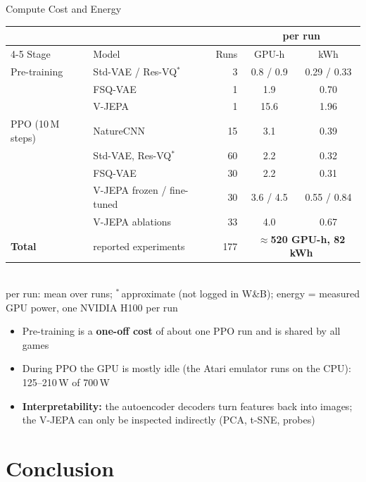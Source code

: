 \documentclass[aspectratio=43,10pt]{beamer}
\begin{document}
\begin{frame}{Compute Cost and Energy}
  \centering
  {\footnotesize\setlength{\tabcolsep}{4pt}
  \begin{tabular}{@{}llrcc@{}}
    \toprule
    & & & \multicolumn{2}{c}{per run} \\
    \cmidrule(lr){4-5}
    Stage & Model & Runs & GPU-h & kWh \\
    \midrule
    Pre-training & Std-VAE / Res-VQ$^{*}$ & 3 & 0.8 / 0.9 & 0.29 / 0.33 \\
     & FSQ-VAE & 1 & 1.9 & 0.70 \\
     & V-JEPA & 1 & 15.6 & 1.96 \\
    \midrule
    PPO (10\,M steps) & NatureCNN & 15 & 3.1 & 0.39 \\
     & Std-VAE, Res-VQ$^{*}$ & 60 & 2.2 & 0.32 \\
     & FSQ-VAE & 30 & 2.2 & 0.31 \\
     & V-JEPA frozen / fine-tuned & 30 & 3.6 / 4.5 & 0.55 / 0.84 \\
     & V-JEPA ablations & 33 & 4.0 & 0.67 \\
    \midrule
    \textbf{Total} & reported experiments & 177 & \multicolumn{2}{c}{\textbf{$\approx$520 GPU-h, 82 kWh}} \\
    \bottomrule
  \end{tabular}}\\[0.2em]
  {\tiny per run: mean over runs; $^{*}$\,approximate (not logged in W\&B); energy = measured GPU power, one NVIDIA H100 per run}
  \vspace{0.3em}
  \begin{itemize}\footnotesize\setlength\itemsep{0.15em}
    \item Pre-training is a \textbf{one-off cost} of about one PPO run and is shared by all games
    \item During PPO the GPU is mostly idle (the Atari emulator runs on the CPU): 125--210\,W of 700\,W
    \item \textbf{Interpretability:} the autoencoder decoders turn features back into images; the
          V-JEPA can only be inspected indirectly (PCA, t-SNE, probes)
  \end{itemize}
\end{frame}

\section{Conclusion}
\end{document}
